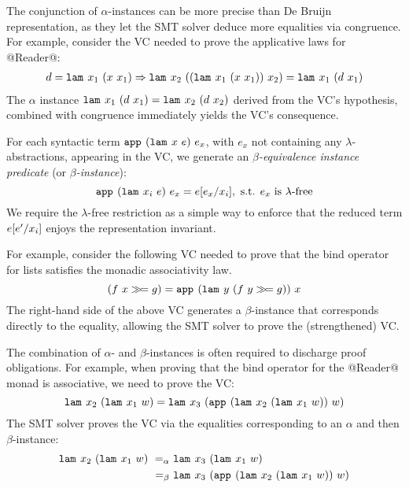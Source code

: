 The conjunction of $\alpha$-instances
can be more precise than De Bruijn
representation, as they let the SMT
solver deduce more equalities via
congruence.
%
For example, consider the VC needed
to prove the applicative laws for @Reader@:
%
\begin{align*}
d  = \slam{x_1}{(\sapp{x}{x_1})} 
   \Rightarrow \slam{x_2}{(\sapp{(\slam{x_1}{(\sapp{x}{x_1})})}{x_2})}
              = \slam{x_1}{(\sapp{d}{x_1})}
\end{align*}
%
The $\alpha$ instance
%
${\slam{x_1}{(\sapp{d}{x_1})} = \slam{x_2}{(\sapp{d}{x_2})}}$
%
derived from the VC's hypothesis,
combined with congruence immediately
yields the VC's consequence.

%
For each syntactic term $\smapp{(\slam{x}{e})}{e_x}$,
with $e_x$ not containing any $\lambda$-abstractions,
appearing in the VC,
we generate an \emph{$\beta$-equivalence instance predicate}
(or \emph{$\beta$-instance}):
$$
\smapp{(\slam{x_i}{e})}{e_x} = \SUBST{e}{x_i}{e_x},
  \mbox{ s.t. } e_x \mbox{ is $\lambda$-free}
$$
%
We require the $\lambda$-free restriction as
a simple way to enforce that the reduced
term ${\SUBST{e}{x_i}{e'}}$ enjoys the
representation invariant.
%

For example, consider the following VC
needed to prove that the bind operator for
lists satisfies the monadic associativity law.
%
$$(\sapp{f}{x} \ebind g) = \smapp{(\slam{y}{(\sapp{f}{y} \ebind g)})}{x}$$
%
The right-hand side of the above VC generates
a $\beta$-instance that corresponds directly
to the equality, allowing the SMT solver to
prove the (strengthened) VC.


%
The combination of $\alpha$- and $\beta$-instances
is often required to discharge proof obligations.
%
For example, when proving that the bind operator
for the @Reader@ monad is associative, we need
to prove the VC:
%
$$\slam{x_2}{(\slam{x_1}{w})} =
  \slam{x_3}{(\smapp{(\slam{x_2}{(\slam{x_1}{w})})}{w})}$$
%
The SMT solver proves the VC via the equalities
corresponding to an $\alpha$ and then $\beta$-instance:
%
\begin{align*}
\slam{x_2}{(\slam{x_1}{w})}
  \ =_{\alpha}\ & \slam{x_3}{(\slam{x_1}{w})} \\
  \ =_{\beta}\ & \slam{x_3}{(\smapp{(\slam{x_2}{(\slam{x_1}{w})})}{w})}
\end{align*}

